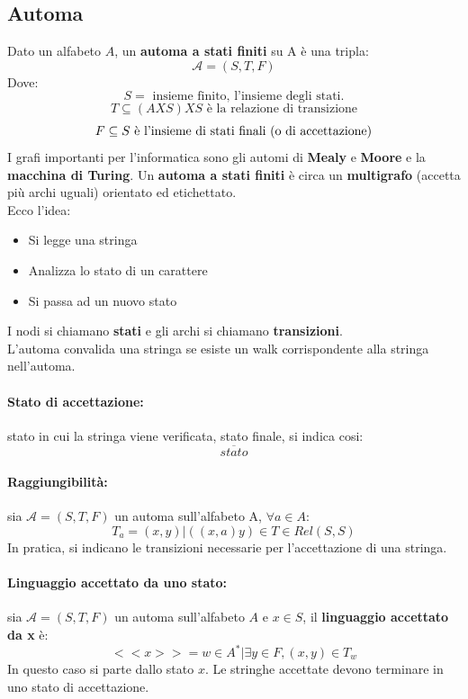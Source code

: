 \documentclass[a4paper,12pt]{article}
\begin{document}
\subsection{Automa}
Dato un alfabeto $A$, un \textbf{automa a stati finiti} su A è una tripla:
\[
\mathcal{A} = (S,T,F)
\]
Dove:
\[
S = \text{ insieme finito, l'insieme degli stati.}
\]
\[
T \subseteq (AXS)XS \text{ è la relazione di transizione}
\]
\[
F \subseteq S \text{ è l'insieme di stati finali (o di accettazione)\\}
\]
I grafi importanti per l'informatica sono gli automi di \textbf{Mealy} e \textbf{Moore} e la \textbf{macchina di Turing}.
Un \textbf{automa a stati finiti} è circa un \textbf{multigrafo} (accetta più archi uguali) orientato ed etichettato.\\
Ecco l'idea:
\begin{itemize}
    \item Si legge una stringa
    \item Analizza lo stato di un carattere
    \item Si passa ad un nuovo stato
\end{itemize}
I nodi si chiamano \textbf{stati} e gli archi si chiamano \textbf{transizioni}.\\
L'automa convalida una stringa se esiste un walk corrispondente alla stringa nell'automa.\\
\paragraph{Stato di accettazione: } stato in cui la stringa viene verificata, stato finale, si indica cosi:
\[
\overline{stato}
\]
\paragraph{Raggiungibilità: } sia $\mathcal{A} = (S,T,F)$ un automa sull'alfabeto A, $\forall a \in A:$
\[
T_a = {(x,y) | ((x,a)y) \in T} \in Rel(S,S)
\]
In pratica, si indicano le transizioni necessarie per l'accettazione di una stringa.
\paragraph{Linguaggio accettato da uno stato: } sia $\mathcal{A} = (S,T,F)$ un automa sull'alfabeto $A$ e $x \in S$, il \textbf{linguaggio accettato da x} è:
\[
<< x >> = {w \in A^* | \exists y \in F, (x,y) \in T_w}
\]
In questo caso si parte dallo stato $x$. Le stringhe accettate devono terminare in uno stato di accettazione.
\end{document}
